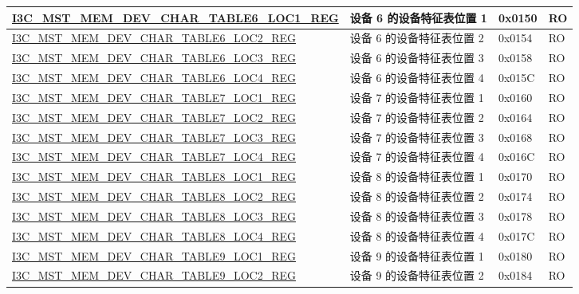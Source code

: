 \begin{longtable}{ | p{8cm} | p{5.5cm} | p{1.3cm} | p{1cm} | }
\hyperref[regdesc:I3CMSTMEMDEVCHARTABLENLOCMREG]{I3C\_MST\_MEM\_DEV\_CHAR\_TABLE6\_LOC1\_REG} & 设备 6 的设备特征表位置 1 & 0x0150 & RO \\ \hline
\hyperref[regdesc:I3CMSTMEMDEVCHARTABLENLOCMREG]{I3C\_MST\_MEM\_DEV\_CHAR\_TABLE6\_LOC2\_REG} & 设备 6 的设备特征表位置 2 & 0x0154 & RO \\ \hline
\hyperref[regdesc:I3CMSTMEMDEVCHARTABLENLOCMREG]{I3C\_MST\_MEM\_DEV\_CHAR\_TABLE6\_LOC3\_REG} & 设备 6 的设备特征表位置 3 & 0x0158 & RO \\ \hline
\hyperref[regdesc:I3CMSTMEMDEVCHARTABLENLOCMREG]{I3C\_MST\_MEM\_DEV\_CHAR\_TABLE6\_LOC4\_REG} & 设备 6 的设备特征表位置 4 & 0x015C & RO \\ \hline
\hyperref[regdesc:I3CMSTMEMDEVCHARTABLENLOCMREG]{I3C\_MST\_MEM\_DEV\_CHAR\_TABLE7\_LOC1\_REG} & 设备 7 的设备特征表位置 1 & 0x0160 & RO \\ \hline
\hyperref[regdesc:I3CMSTMEMDEVCHARTABLENLOCMREG]{I3C\_MST\_MEM\_DEV\_CHAR\_TABLE7\_LOC2\_REG} & 设备 7 的设备特征表位置 2 & 0x0164 & RO \\ \hline
\hyperref[regdesc:I3CMSTMEMDEVCHARTABLENLOCMREG]{I3C\_MST\_MEM\_DEV\_CHAR\_TABLE7\_LOC3\_REG} & 设备 7 的设备特征表位置 3 & 0x0168 & RO \\ \hline
\hyperref[regdesc:I3CMSTMEMDEVCHARTABLENLOCMREG]{I3C\_MST\_MEM\_DEV\_CHAR\_TABLE7\_LOC4\_REG} & 设备 7 的设备特征表位置 4 & 0x016C & RO \\ \hline
\hyperref[regdesc:I3CMSTMEMDEVCHARTABLENLOCMREG]{I3C\_MST\_MEM\_DEV\_CHAR\_TABLE8\_LOC1\_REG} & 设备 8 的设备特征表位置 1 & 0x0170 & RO \\ \hline
\hyperref[regdesc:I3CMSTMEMDEVCHARTABLENLOCMREG]{I3C\_MST\_MEM\_DEV\_CHAR\_TABLE8\_LOC2\_REG} & 设备 8 的设备特征表位置 2 & 0x0174 & RO \\ \hline
\hyperref[regdesc:I3CMSTMEMDEVCHARTABLENLOCMREG]{I3C\_MST\_MEM\_DEV\_CHAR\_TABLE8\_LOC3\_REG} & 设备 8 的设备特征表位置 3 & 0x0178 & RO \\ \hline
\hyperref[regdesc:I3CMSTMEMDEVCHARTABLENLOCMREG]{I3C\_MST\_MEM\_DEV\_CHAR\_TABLE8\_LOC4\_REG} & 设备 8 的设备特征表位置 4 & 0x017C & RO \\ \hline
\hyperref[regdesc:I3CMSTMEMDEVCHARTABLENLOCMREG]{I3C\_MST\_MEM\_DEV\_CHAR\_TABLE9\_LOC1\_REG} & 设备 9 的设备特征表位置 1 & 0x0180 & RO \\ \hline
\hyperref[regdesc:I3CMSTMEMDEVCHARTABLENLOCMREG]{I3C\_MST\_MEM\_DEV\_CHAR\_TABLE9\_LOC2\_REG} & 设备 9 的设备特征表位置 2 & 0x0184 & RO \\ \hline

\end{longtable}
